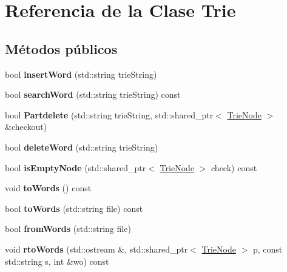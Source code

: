 \hypertarget{classTrie}{}\section{Referencia de la Clase Trie}
\label{classTrie}
\subsection*{Métodos públicos}
\begin{DoxyCompactItemize}
\item 
\mbox{\label{classTrie_ac18a0cc7b8da85bedbae78985a4d7043}} 
bool {\bfseries insert\+Word} (std\+::string trie\+String)
\item 
\mbox{\label{classTrie_a03a9574a1ad1bc5b5de370f8c90d99bd}} 
bool {\bfseries search\+Word} (std\+::string trie\+String) const
\item 
\mbox{\label{classTrie_a5833fe39635de0d411d4d68c1c84a428}} 
bool {\bfseries Partdelete} (std\+::string trie\+String, std\+::shared\+\_\+ptr$<$ \hyperlink{classTrieNode}{Trie\+Node} $>$ \&checkout)
\item 
\mbox{\label{classTrie_a96164721b6b7d7485c49582052c6ad36}} 
bool {\bfseries delete\+Word} (std\+::string trie\+String)
\item 
\mbox{\label{classTrie_a5187750d2da34c5bffb2b761f36fef41}} 
bool {\bfseries is\+Empty\+Node} (std\+::shared\+\_\+ptr$<$ \hyperlink{classTrieNode}{Trie\+Node} $>$ check) const
\item 
\mbox{\label{classTrie_a1246875ce86e4d5d046dcc1228c01abc}} 
void {\bfseries to\+Words} () const
\item 
\mbox{\label{classTrie_a3dfeef83ccfa455c4728b647a4520f9d}} 
bool {\bfseries to\+Words} (std\+::string file) const
\item 
\mbox{\label{classTrie_a3361016ec2bfc7bed03a565cdb8d7c25}} 
bool {\bfseries from\+Words} (std\+::string file)
\item 
\mbox{\label{classTrie_a55e276fa3ffe4ec0b96bb5fc921055ad}} 
void {\bfseries rto\+Words} (std\+::ostream \&, std\+::shared\+\_\+ptr$<$ \hyperlink{classTrieNode}{Trie\+Node} $>$ p, const std\+::string s, int \&wo) const

\end{DoxyCompactItemize}
